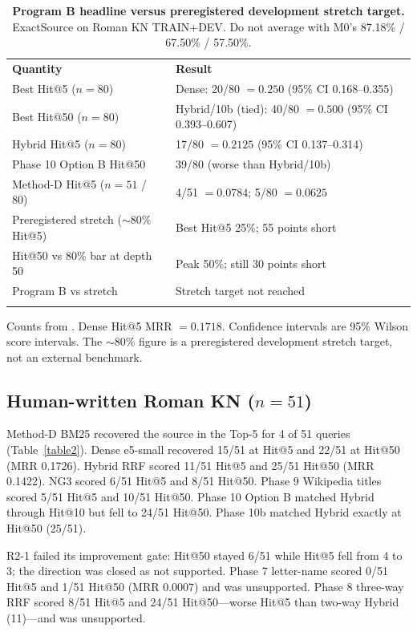 \documentclass[10pt,letterpaper]{article}
\newlength\savedwidth
\newcommand\thickhline{\noalign{\global\savedwidth\arrayrulewidth\global\arrayrulewidth 2pt}%
\hline
\noalign{\global\arrayrulewidth\savedwidth}}
\begin{document}
\begin{table}[!ht]
\centering
\caption{\textbf{Program B headline versus preregistered development stretch target.} ExactSource on Roman KN TRAIN+DEV. Do not average with M0's 87.18\% / 67.50\% / 57.50\%.}
\label{table1}
\begin{tabular}{ll}
\thickhline
\textbf{Quantity} & \textbf{Result} \\
\thickhline
Best Hit@5 ($n = 80$) & Dense: 20/80 $= 0.250$ (95\% CI 0.168--0.355) \\
Best Hit@50 ($n = 80$) & Hybrid/10b (tied): 40/80 $= 0.500$ (95\% CI 0.393--0.607) \\
Hybrid Hit@5 ($n = 80$) & 17/80 $= 0.2125$ (95\% CI 0.137--0.314) \\
Phase 10 Option B Hit@50 & 39/80 (worse than Hybrid/10b) \\
Method-D Hit@5 ($n = 51$ / 80) & 4/51 $= 0.0784$; 5/80 $= 0.0625$ \\
Preregistered stretch ($\sim$80\% Hit@5) & Best Hit@5 25\%; 55 points short \\
Hit@50 vs 80\% bar at depth 50 & Peak 50\%; still 30 points short \\
Program B vs stretch & Stretch target not reached \\
\thickhline
\end{tabular}
\begin{flushleft} Counts from . Dense Hit@5 MRR $= 0.1718$. Confidence intervals are 95\% Wilson score intervals. The $\sim$80\% figure is a preregistered development stretch target, not an external benchmark.
\end{flushleft}
\end{table}

\subsection*{Human-written Roman KN ($n = 51$)}

Method-D BM25 recovered the source in the Top-5 for 4 of 51 queries (Table~\ref{table2}). Dense e5-small recovered 15/51 at Hit@5 and 22/51 at Hit@50 (MRR 0.1726). Hybrid RRF scored 11/51 Hit@5 and 25/51 Hit@50 (MRR 0.1422). NG3 scored 6/51 Hit@5 and 8/51 Hit@50. Phase 9 Wikipedia titles scored 5/51 Hit@5 and 10/51 Hit@50. Phase 10 Option B matched Hybrid through Hit@10 but fell to 24/51 Hit@50. Phase 10b matched Hybrid exactly at Hit@50 (25/51).

R2-1 failed its improvement gate: Hit@50 stayed 6/51 while Hit@5 fell from 4 to 3; the direction was closed as not supported. Phase 7 letter-name scored 0/51 Hit@5 and 1/51 Hit@50 (MRR 0.0007) and was unsupported. Phase 8 three-way RRF scored 8/51 Hit@5 and 24/51 Hit@50---worse Hit@5 than two-way Hybrid (11)---and was unsupported.
\end{document}
